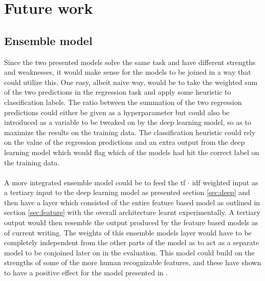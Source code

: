 
\section{Future work}

\subsection{Ensemble model}
Since the two presented models solve the same task and have different strengths and weaknesses, it would make sense for the models to be joined in a way that could utilize this. One easy, albeit naive way, would be to take the weighted sum of the two predictions in the regression task and apply some heuristic to classification labels. The ratio between the summation of the two regression predictions could either be given as a hyperparameter but could also be introduced as a variable to be tweaked on by the deep learning model, so as to maximize the results on the training data. The classification heuristic could rely on the value of the regression predictions and an extra output from the deep learning model which would flag which of the models had hit the correct label on the training data.\\
\\
A more integrated ensemble model could be to feed the tf $\cdot$ idf weighted input as a tertiary input to the deep learning model as presented section \ref{sec:deep} and then have a layer which consisted of the entire feature based model as outlined in section \ref{sec:feature} with the overall architecture learnt experimentally. A tertiary output would then resemble the output produced by the feature based models as of current writing. The weights of this ensemble models layer would have to be completely independent from the other parts of the model as to act as a separate model to be conjoined later on in the evaluation. This model could build on the strengths of some of the more human recognizable features, and these have shown to have a positive effect for the model presented in \cite{ims}.

